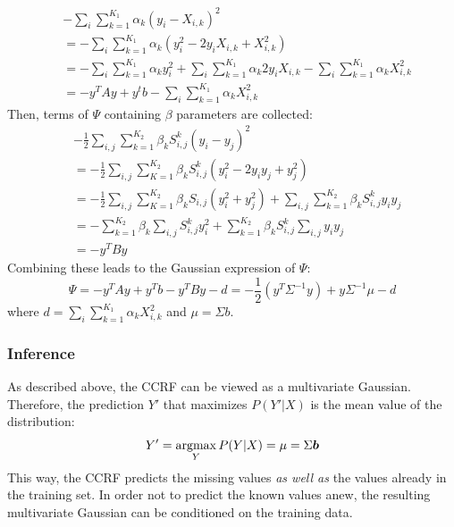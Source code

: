 \begin{equation}
\begin{split}
& -\sum_i \sum \limits_{k=1}^{K_1} \alpha_k(y_i-X_{i,k})^2 \\
& = -\sum_i \sum \limits_{k=1}^{K_1} \alpha_k(y_i^2-2y_iX_{i,k}+X_{i,k}^2) \\
& = -\sum_i \sum \limits_{k=1}^{K_1} \alpha_k y_i^2 + \sum_i \sum\limits_{k=1}^{K_1} \alpha_k 2y_i X_{i,k} - \sum_i \sum\limits_{k=1}^{K_1} \alpha_k X_{i,k}^2\\
& = -y^TAy + y^tb - \sum_i \sum\limits_{k=1}^{K_1} \alpha_k X_{i,k}^2
\end{split}
\end{equation}
Then, terms of $\Psi$ containing $\beta$ parameters are collected:
\begin{equation}
\begin{split}
& -\frac{1}{2}\sum_{i,j}\sum\limits_{k=1}^{K_2}\beta_k S_{i,j}^k(y_i-y_j)^2\\
& = -\frac{1}{2}\sum_{i,j}\sum\limits_{K=1}^{K_2}\beta_k S_{i,j}^k(y_i^2-2y_iy_j+y_j^2)\\
& = -\frac{1}{2}\sum_{i,j}\sum\limits_{K=1}^{K_2}\beta_k S_{i,j}(y_i^2+y_j^2) + \sum_{i,j} \sum\limits_{k=1}^{K_2}\beta_k S_{i,j}^ky_iy_j\\
& =  -\sum\limits_{k=1}^{K_2}\beta_k\sum_{i,j}S_{i,j}^ky_i^2 + \sum\limits_{k=1}^{K_2}\beta_kS_{i,j}^k\sum_{i,j}y_iy_j\\
& = -y^TBy
\end{split}
\end{equation}
Combining these leads to the Gaussian expression of $\Psi$:
\begin{equation}
\Psi=-y^TAy + y^Tb - y^TBy - d = - \frac{1}{2}(y^T\Sigma^{-1}y)+y\Sigma^{-1}\mu - d
\end{equation}
where $d=\sum_i\sum\limits_{k=1}^{K_1}\alpha_kX_{i,k}^2$ and $\mu = \Sigma b$.

\subsubsection{Inference}

As described above, the CCRF can be viewed as a multivariate Gaussian. Therefore, the prediction $Y'$ that maximizes $P(Y'|X)$ is the mean value of the distribution:
\begin{equation}
Y' = \operatorname*{argmax}_{Y} P(Y|X) = \mu = \Sigma\boldsymbol{b}
\end{equation}
This way, the CCRF predicts the missing values \textit{as well as} the values already in the training set. In order not to predict the known values anew, the resulting multivariate Gaussian can be conditioned on the training data.

